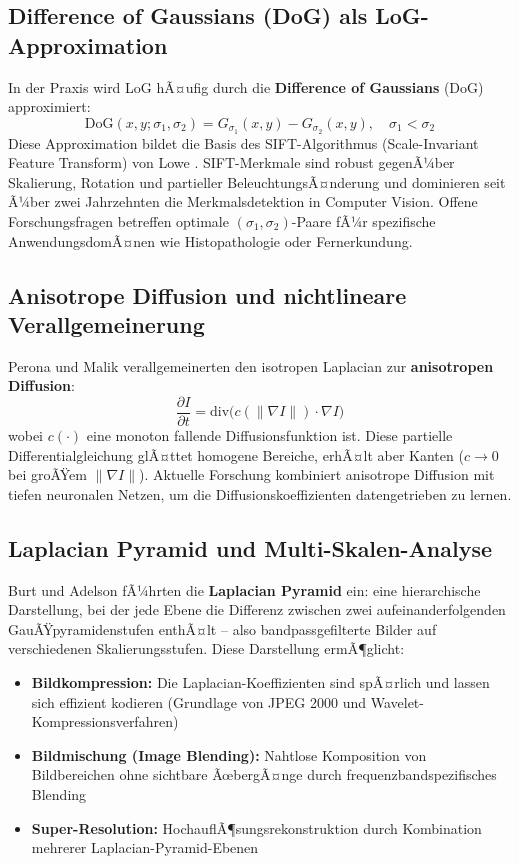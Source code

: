 ﻿\documentclass[a4paper,12pt]{article}
\theoremstyle{definition}
\begin{document}
\subsection{Difference of Gaussians (DoG) als LoG-Approximation}

In der Praxis wird LoG hÃ¤ufig durch die \textbf{Difference of Gaussians} (DoG) approximiert:
\[
    \text{DoG}(x,y;\sigma_1,\sigma_2) = G_{\sigma_1}(x,y) - G_{\sigma_2}(x,y), \quad \sigma_1 < \sigma_2
\]
Diese Approximation bildet die Basis des SIFT-Algorithmus (Scale-Invariant Feature Transform) von
Lowe \cite{lowe2004}. SIFT-Merkmale sind robust gegenÃ¼ber Skalierung, Rotation und partieller
BeleuchtungsÃ¤nderung und dominieren seit Ã¼ber zwei Jahrzehnten die Merkmalsdetektion in Computer Vision.
Offene Forschungsfragen betreffen optimale $(\sigma_1, \sigma_2)$-Paare fÃ¼r spezifische AnwendungsdomÃ¤nen
wie Histopathologie oder Fernerkundung.

\subsection{Anisotrope Diffusion und nichtlineare Verallgemeinerung}

Perona und Malik \cite{perona1990} verallgemeinerten den isotropen Laplacian zur \textbf{anisotropen
Diffusion}:
\[
    \frac{\partial I}{\partial t} = \mathrm{div}\bigl(c(\|\nabla I\|) \cdot \nabla I\bigr)
\]
wobei $c(\cdot)$ eine monoton fallende Diffusionsfunktion ist. Diese partielle Differentialgleichung
glÃ¤ttet homogene Bereiche, erhÃ¤lt aber Kanten ($c \to 0$ bei groÃŸem $\|\nabla I\|$). Aktuelle
Forschung kombiniert anisotrope Diffusion mit tiefen neuronalen Netzen, um die Diffusionskoeffizienten
datengetrieben zu lernen.

\subsection{Laplacian Pyramid und Multi-Skalen-Analyse}

Burt und Adelson \cite{burt1983} fÃ¼hrten die \textbf{Laplacian Pyramid} ein: eine hierarchische
Darstellung, bei der jede Ebene die Differenz zwischen zwei aufeinanderfolgenden GauÃŸpyramidenstufen
enthÃ¤lt -- also bandpassgefilterte Bilder auf verschiedenen Skalierungsstufen. Diese Darstellung
ermÃ¶glicht:
\begin{itemize}
    \item \textbf{Bildkompression:} Die Laplacian-Koeffizienten sind spÃ¤rlich und lassen sich
          effizient kodieren (Grundlage von JPEG 2000 und Wavelet-Kompressionsverfahren)
    \item \textbf{Bildmischung (Image Blending):} Nahtlose Komposition von Bildbereichen ohne
          sichtbare ÃœbergÃ¤nge durch frequenzbandspezifisches Blending
    \item \textbf{Super-Resolution:} HochauflÃ¶sungsrekonstruktion durch Kombination mehrerer
          Laplacian-Pyramid-Ebenen
\end{itemize}
\end{document}
